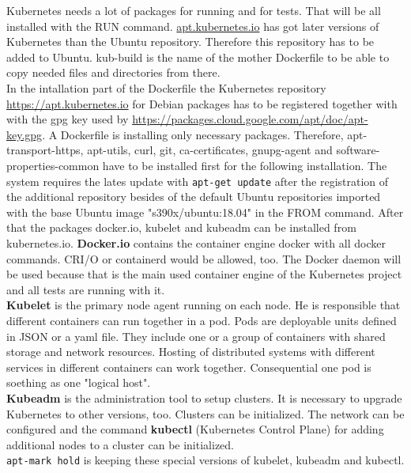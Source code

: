 Kubernetes needs a lot of packages for running and for tests. That will be all installed with the RUN command.
\url{apt.kubernetes.io} has got later versions of Kubernetes than the Ubuntu repository. Therefore this repository has to be added to Ubuntu. kub-build is the name of the mother Dockerfile to be able to copy needed files and directories from there. \\
In the intallation part of the Dockerfile the Kubernetes repository \url{https://apt.kubernetes.io} for Debian packages has to be registered together with with the gpg key used by  \url{https://packages.cloud.google.com/apt/doc/apt-key.gpg}.
A Dockerfile is installing only necessary packages. Therefore, apt-transport-https, apt-utils, curl, git, ca-certificates, gnupg-agent and software-properties-common have to be installed first for the following installation.
The system requires the lates update with \lstinline!apt-get update! after the registration of the additional repository besides of the default Ubuntu repositories imported with the base Ubuntu image "s390x/ubuntu:18.04" in the FROM command. After that the packages docker.io, kubelet and kubeadm can be installed from kubernetes.io. \textbf{Docker.io} contains the container engine docker with all docker commands. CRI/O or containerd would be allowed, too. 
The Docker daemon will be used because that is the main used container engine of the Kubernetes project and all tests are running with it. \\ \textbf{Kubelet} is the primary node agent running on each node. He is responsible that different containers can run together in a pod. Pods are deployable units defined in JSON or a yaml file. 
They include one or a group of containers with shared storage and network resources. Hosting of distributed systems  with different services in different containers can work together. Consequential one pod is soething as one "logical host". \\
\textbf{Kubeadm} is the administration tool to setup clusters. It is necessary to upgrade Kubernetes to other versions, too. Clusters can be initialized. The network can be configured and the command \textbf{kubectl} (Kubernetes Control Plane) for adding additional nodes to a cluster can be initialized. \\
\lstinline!apt-mark hold! is keeping these special versions of kubelet, kubeadm and kubectl. 

